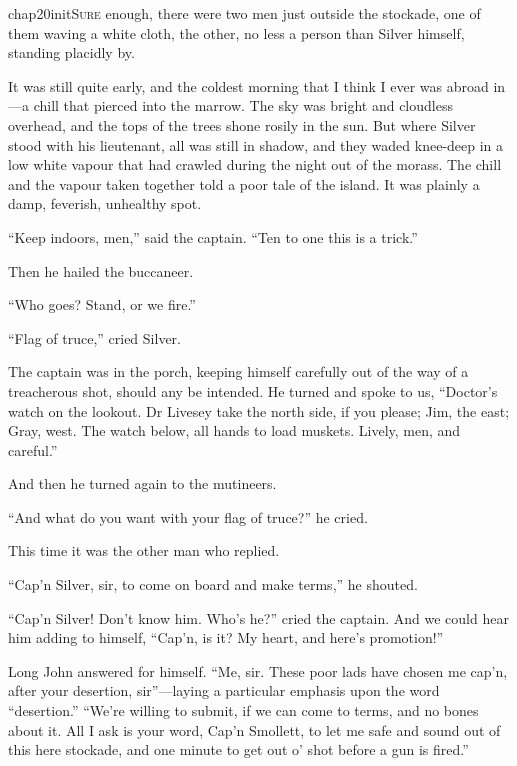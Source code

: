 
   \lettrine[lines=4,image=true]{chap20initS}{ure} enough, there were two men just outside the stockade, one of them waving a white cloth, the other, no less a person than Silver himself, standing placidly by.

It was still quite early, and the coldest morning that I think I ever was abroad in---a chill that pierced into the marrow. The sky was bright and cloudless overhead, and the tops of the trees shone rosily in the sun. But where Silver stood with his lieutenant, all was still in shadow, and they waded knee-deep in a low white vapour that had crawled during the night out of the morass. The chill and the vapour taken together told a poor tale of the island. It was plainly a damp, feverish, unhealthy spot.

\enquote{Keep indoors, men,} said the captain. \enquote{Ten to one this is a trick.}

Then he hailed the buccaneer.

\enquote{Who goes? Stand, or we fire.}

\enquote{Flag of truce,} cried Silver.

The captain was in the porch, keeping himself carefully out of the way of a treacherous shot, should any be intended. He turned and spoke to us, \enquote{Doctor’s watch on the lookout. Dr Livesey take the north side, if you please; Jim, the east; Gray, west. The watch below, all hands to load muskets. Lively, men, and careful.}

And then he turned again to the mutineers.

\enquote{And what do you want with your flag of truce?} he cried.

This time it was the other man who replied.

\enquote{Cap’n Silver, sir, to come on board and make terms,} he shouted.

\enquote{Cap’n Silver! Don’t know him. Who’s he?} cried the captain. And we could hear him adding to himself, \enquote{Cap’n, is it? My heart, and here’s promotion!}

Long John answered for himself. \enquote{Me, sir. These poor lads have chosen me cap’n, after your desertion, sir}---laying a particular emphasis upon the word \enquote{desertion.} \enquote{We’re willing to submit, if we can come to terms, and no bones about it. All I ask is your word, Cap’n Smollett, to let me safe and sound out of this here stockade, and one minute to get out o’ shot before a gun is fired.}


